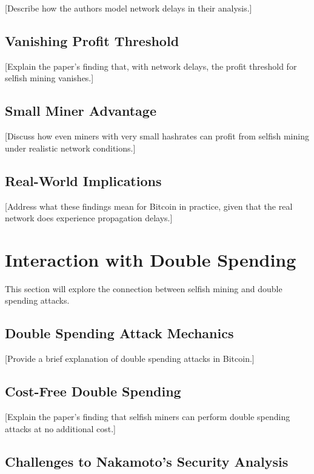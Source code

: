 \documentclass[conference]{IEEEtran}
\begin{document}
[Describe how the authors model network delays in their analysis.]

\subsection{Vanishing Profit Threshold}

[Explain the paper's finding that, with network delays, the profit threshold for selfish mining vanishes.]

\subsection{Small Miner Advantage}

[Discuss how even miners with very small hashrates can profit from selfish mining under realistic network conditions.]

\subsection{Real-World Implications}

[Address what these findings mean for Bitcoin in practice, given that the real network does experience propagation delays.]

\section{Interaction with Double Spending}

This section will explore the connection between selfish mining and double spending attacks.

\subsection{Double Spending Attack Mechanics}

[Provide a brief explanation of double spending attacks in Bitcoin.]

\subsection{Cost-Free Double Spending}

[Explain the paper's finding that selfish miners can perform double spending attacks at no additional cost.]

\subsection{Challenges to Nakamoto's Security Analysis}
\end{document}
